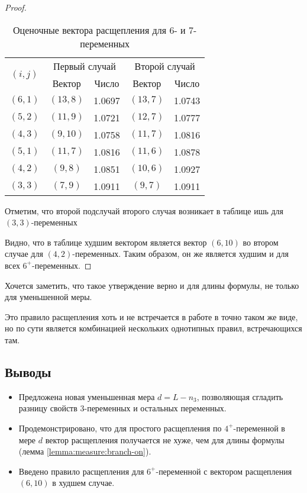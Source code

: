 \begin{proof}
 \begin{table}[ht]
  \centering
  \caption{Оценочные вектора расщепления для 6- и 7-переменных}
  \begin{tabular}{|c|c|c|c|c|}
   \hline
   \multirow{2}{*}{$(i,j)$} & \multicolumn{2}{|c|}{Первый случай} & \multicolumn{2}{|c|}{Второй случай} \\
   \cline{2-5}
                            & Вектор & Число                      & Вектор & Число \\
   \hline
   $(6,1)$ & $(13,8)$ & 1.0697 & $(13,7)$ & 1.0743 \\
   $(5,2)$ & $(11,9)$ & 1.0721 & $(12,7)$ & 1.0777 \\
   $(4,3)$ & $(9,10)$ & 1.0758 & $(11,7)$ & 1.0816 \\
   \hline
   $(5,1)$ & $(11,7)$ & 1.0816 & $(11,6)$ & 1.0878 \\
   $(4,2)$ & $(9,8)$  & 1.0851 & $(10,6)$ & 1.0927 \\
   $(3,3)$ & $(7,9)$  & 1.0911 & $(9,7)$  & 1.0911 \\
   \hline
  \end{tabular}
  \label{table:sixplus}
 \end{table}

Отметим, что второй подслучай второго случая возникает в таблице  ишь для $(3,3)$-переменных

Видно, что в таблице худшим вектором является вектор $(6,10)$ во втором случае для $(4,2)$-переменных. Таким образом, он же является худшим и для всех $6^+$-переменных.
\end{proof}

Хочется заметить, что такое утверждение верно и для длины формулы, не только для уменьшенной меры.

Это правило расщепления хоть и не встречается в работе \cite{bansal99} в точно таком же виде, но по сути является комбинацией нескольких однотипных правил, встречающихся там.

\subsection{Выводы}
\label{subsec:measure:summary}

\begin{itemize}
 \item Предложена новая уменьшенная мера $d = L - n_3$, позволяющая сгладить разницу свойств 3-переменных и остальных переменных.
 \item Продемонстрировано, что для простого расщепления по $4^+$-переменной в мере $d$ вектор расщепления получается не хуже, чем для длины формулы (лемма \ref{lemma:measure:branch-on}).
 \item Введено правило расщепления для $6^+$-переменной с вектором расщепления $(6,10)$ в худшем случае.
\end{itemize}

